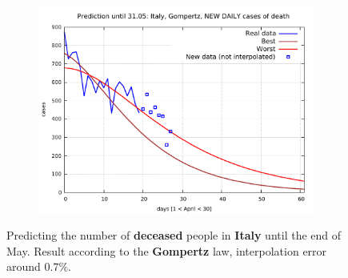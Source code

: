 \documentclass[8pt]{article}
\begin{document}
\begin{figure}[h!]
\begin{subfigure}[b]{0.48\linewidth}
  \includegraphics[width=\linewidth]{../it_g_d/peak/peak_prediction.pdf}
  \end{subfigure}
	\caption{Predicting the number of \textbf{deceased}
	people in \textbf{Italy} until the
	end of May. Result according to the \textbf{Gompertz} law, 
	interpolation error around $0.7\%$.}
\end{figure}
\end{document}
